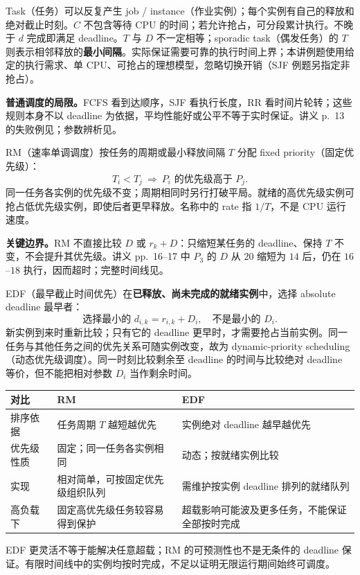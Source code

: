 Task（任务）可以反复产生 job / instance（作业实例）；每个实例有自己的释放和绝对截止时刻。$C$ 不包含等待 CPU 的时间；若允许抢占，可分段累计执行。不晚于 $d$ 完成即满足 deadline。$T$ 与 $D$ 不一定相等；sporadic task（偶发任务）的 $T$ 则表示相邻释放的\textbf{最小间隔}。实际保证需要可靠的执行时间上界；本讲例题使用给定的执行需求、单 CPU、可抢占的理想模型，忽略切换开销（SJF 例题另指定非抢占）。

\textbf{普通调度的局限。}FCFS 看到达顺序，SJF 看执行长度，RR 看时间片轮转；这些规则本身不以 deadline 为依据，平均性能好或公平不等于实时保证。讲义 p.~13 的失败例见；参数辨析见。


RM（速率单调调度）按任务的周期或最小释放间隔 $T$ 分配 fixed priority（固定优先级）：
\[
  \boxed{T_i<T_j\ \Longrightarrow\ P_i\text{ 的优先级高于 }P_j.}
\]
同一任务各实例的优先级不变；周期相同时另行打破平局。就绪的高优先级实例可抢占低优先级实例，即使后者更早释放。名称中的 rate 指 $1/T$，不是 CPU 运行速度。

\textbf{关键边界。}RM 不直接比较 $D$ 或 $r_k+D$：只缩短某任务的 deadline、保持 $T$ 不变，不会提升其优先级。讲义 pp.~16--17 中 $P_3$ 的 $D$ 从 $20$ 缩短为 $14$ 后，仍在 $16$--$18$ 执行，因而超时；完整时间线见。


EDF（最早截止时间优先）在\textbf{已释放、尚未完成的就绪实例}中，选择 absolute deadline 最早者：
\[
  \boxed{\text{选择最小的 }d_{i,k}=r_{i,k}+D_i,\quad\text{不是最小的 }D_i.}
\]
新实例到来时重新比较；只有它的 deadline 更早时，才需要抢占当前实例。同一任务与其他任务之间的优先关系可随实例改变，故为 dynamic-priority scheduling（动态优先级调度）。同一时刻比较剩余至 deadline 的时间与比较绝对 deadline 等价，但不能把相对参数 $D_i$ 当作剩余时间。

\begin{center}
\begin{tabularx}{\textwidth}{@{}lXX@{}}
  \toprule
  对比 & RM & EDF \\
  \midrule
  排序依据 & 任务周期 $T$ 越短越优先 & 实例绝对 deadline 越早越优先 \\
  优先级性质 & 固定；同一任务各实例相同 & 动态；按就绪实例比较 \\
  实现 & 相对简单，可按固定优先级组织队列 & 需维护按实例 deadline 排列的就绪队列 \\
  高负载下 & 固定高优先级任务较容易得到保护 & 超载影响可能波及更多任务，不能保证全部按时完成 \\
  \bottomrule
\end{tabularx}
\end{center}
EDF 更灵活不等于能解决任意超载；RM 的可预测性也不是无条件的 deadline 保证。有限时间线中的实例均按时完成，不足以证明无限运行期间始终可调度。

